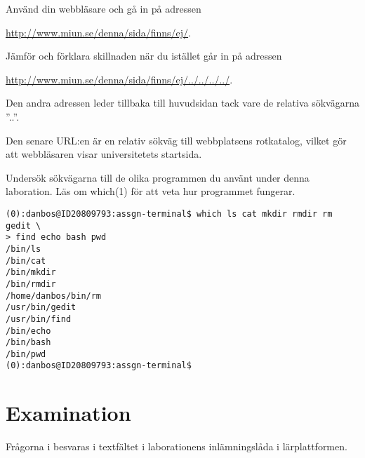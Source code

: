 \documentclass[a4paper]{miunasgn}
\begin{document}
\begin{questions}
	\question\label{q:RelativeWWW}
	Använd din webbläsare och gå in på adressen
	\begin{center}
		\url{http://www.miun.se/denna/sida/finns/ej/}.
	\end{center}
	Jämför och förklara skillnaden när du istället går in på adressen
	\begin{center}
		\url{http://www.miun.se/denna/sida/finns/ej/../../../../}.
	\end{center}
	\begin{solution}
		Den andra adressen leder tillbaka till huvudsidan tack vare de relativa
		sökvägarna ''..''.
	\end{solution}
	\begin{solution}
		Den senare URL:en är en relativ sökväg till webbplatsens rotkatalog, vilket 
		gör att webbläsaren visar universitetets startsida.
	\end{solution}

	\question\label{q:which}
	Undersök sökvägarna till de olika programmen du använt under denna 
	laboration.
	Läs om which(1) för att veta hur programmet fungerar.
	\begin{solution}
		\begin{lstlisting}
(0):danbos@ID20809793:assgn-terminal$ which ls cat mkdir rmdir rm gedit \
> find echo bash pwd
/bin/ls
/bin/cat
/bin/mkdir
/bin/rmdir
/home/danbos/bin/rm
/usr/bin/gedit
/usr/bin/find
/bin/echo
/bin/bash
/bin/pwd
(0):danbos@ID20809793:assgn-terminal$
		\end{lstlisting}
	\end{solution}

\end{questions}


\section{Examination}
\label{sec:Examination}
\noindent
Frågorna i  besvaras i textfältet i laborationens 
inlämningslåda i lärplattformen.



\end{document}

